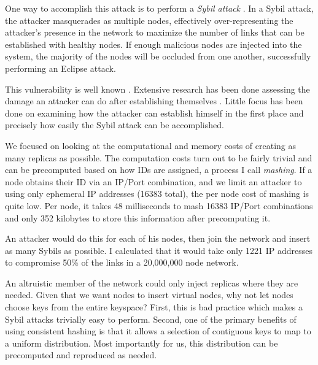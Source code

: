 One way to accomplish this attack is to perform a \emph{Sybil attack} \cite{sybil}.
In a Sybil attack, the attacker masquerades as multiple nodes, effectively over-representing the attacker's presence in the network to maximize the number of links that can be established with healthy nodes.
If enough malicious nodes are injected into the system, the majority of the nodes will be occluded from one another, successfully performing an Eclipse attack.


This vulnerability is well known \cite{dhtsec}.
Extensive research has been done assessing the damage an attacker can do after establishing themselves \cite{srivatsa2004vulnerabilities}.
Little focus has been done on examining how the attacker can establish himself in the first place and precisely how easily the Sybil attack can be accomplished.

We focused on looking at the computational and memory costs of creating as many replicas as possible.
The computation costs turn out to be fairly trivial and can be precomputed based on how IDs are assigned, a process I call \textit{mashing}.
If a node obtains their ID via an IP/Port combination, and we limit an attacker to using only ephemeral IP addresses (16383 total), the per node cost of mashing is quite low.
Per node, it takes 48 milliseconds to mash 16383 IP/Port combinations and only 352 kilobytes to store this information after precomputing it.


An attacker would do this for each of his nodes, then join the network and insert as many Sybils as possible.
I calculated that it would take only 1221 IP addresses to compromise 50\% of the links in a 20,000,000 node network.

An altruistic member of the network could only inject replicas where they are needed.
Given that we want nodes to insert virtual nodes, why not let nodes choose keys from the entire keyspace?
First, this is bad practice which makes a Sybil attacks trivially easy to perform.
Second, one of the primary benefits of using consistent hashing is that it allows a selection of contiguous keys to map to a uniform distribution.
Most importantly for us, this distribution can be precomputed and reproduced as needed.
